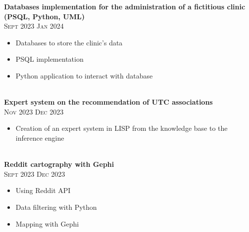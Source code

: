 \documentclass[oneside]{article}
\begin{document}
{\begin{minipage}[t][\dimexpr\textheight-2\fboxrule-2\fboxsep\relax][t]{\dimexpr0.6\textwidth-2\fboxrule-2\fboxsep\relax}
        {\large \textbf{Databases implementation for the administration of a fictitious clinic (PSQL, Python, UML)}} \\
        {\scshape{}\selectfont\footnotesize Sept 2023 \textendash{} Jan 2024} \\
        \vspace{-\baselineskip}
        \vspace{0.2cm}
        \begin{itemize}
            \setlength{\itemsep}{-5pt}
            \item Databases to store the clinic’s data
            \item PSQL implementation
            \item Python application to interact  with database
        \end{itemize}\\

        {\large \textbf{Expert system on the recommendation of UTC associations}} \\
        {\scshape{}\selectfont\footnotesize Nov 2023 \textendash{} Dec 2023} \\
        \vspace{-\baselineskip}
        \vspace{0.2cm}
        \begin{itemize}
            \setlength{\itemsep}{-5pt}
            \item Creation of an expert system in LISP from the knowledge base to the inference engine
        \end{itemize}\\
        
        {\large \textbf{Reddit cartography with Gephi}} \\
        {\scshape{}\selectfont\footnotesize Sept 2023 \textendash{} Dec 2023} \\
        \vspace{-\baselineskip}
        \vspace{0.2cm}
        \begin{itemize}
            \setlength{\itemsep}{-5pt}
            \item Using Reddit API
            \item Data filtering with Python
            \item Mapping with Gephi
        \end{itemize}\\


\end{minipage}}
\end{document}
